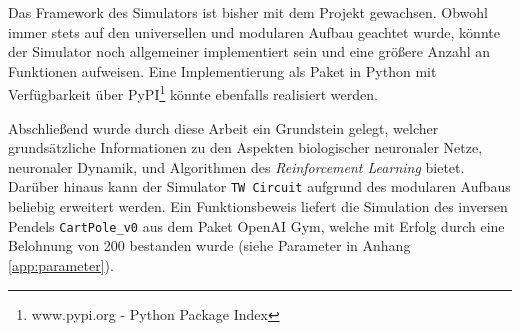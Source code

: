 	Das Framework des Simulators ist bisher mit dem Projekt gewachsen. Obwohl immer stets auf den universellen und modularen Aufbau geachtet wurde, könnte der Simulator noch allgemeiner implementiert sein und eine größere Anzahl an Funktionen aufweisen. Eine Implementierung als Paket in Python mit Verfügbarkeit über PyPI\footnote{www.pypi.org - Python Package Index} könnte ebenfalls realisiert werden.
	
	Abschließend wurde durch diese Arbeit ein Grundstein gelegt, welcher grundsätzliche Informationen zu den Aspekten biologischer neuronaler Netze, neuronaler Dynamik, und Algorithmen des \textit{Reinforcement Learning} bietet. Darüber hinaus kann der Simulator \texttt{TW Circuit} aufgrund des modularen Aufbaus beliebig erweitert werden. Ein Funktionsbeweis liefert die Simulation des inversen Pendels \texttt{CartPole\_v0} aus dem Paket OpenAI Gym, welche mit Erfolg durch eine Belohnung von 200 bestanden wurde (siehe Parameter in Anhang \ref{app:parameter}).

